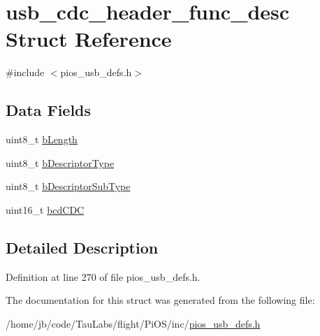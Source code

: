 \hypertarget{structusb__cdc__header__func__desc}{\section{usb\-\_\-cdc\-\_\-header\-\_\-func\-\_\-desc \-Struct \-Reference}
\label{structusb__cdc__header__func__desc}
}


{\ttfamily \#include $<$pios\-\_\-usb\-\_\-defs.\-h$>$}

\subsection*{\-Data \-Fields}
\begin{DoxyCompactItemize}
\item 
uint8\-\_\-t \hyperlink{group___p_i_o_s___u_s_b___d_e_f_s_ga15e505dd53db0e081c58b58f3fcd1ae0}{b\-Length}
\item 
uint8\-\_\-t \hyperlink{group___p_i_o_s___u_s_b___d_e_f_s_ga09d781c982c0be7203ec0922f818350d}{b\-Descriptor\-Type}
\item 
uint8\-\_\-t \hyperlink{group___p_i_o_s___u_s_b___d_e_f_s_ga9bdb88cd9eb6973d4b508010df9d45ff}{b\-Descriptor\-Sub\-Type}
\item 
uint16\-\_\-t \hyperlink{group___p_i_o_s___u_s_b___d_e_f_s_gaedee5ac39032e71dd0837e37f480a398}{bcd\-C\-D\-C}
\end{DoxyCompactItemize}


\subsection{\-Detailed \-Description}


\-Definition at line 270 of file pios\-\_\-usb\-\_\-defs.\-h.



\-The documentation for this struct was generated from the following file\-:\begin{DoxyCompactItemize}
\item 
/home/jb/code/\-Tau\-Labs/flight/\-Pi\-O\-S/inc/\hyperlink{pios__usb__defs_8h}{pios\-\_\-usb\-\_\-defs.\-h}\end{DoxyCompactItemize}
